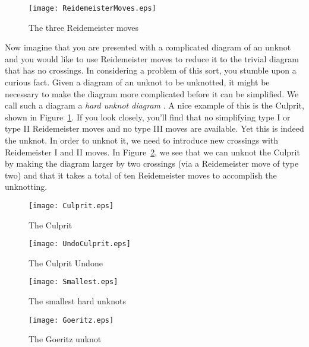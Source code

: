 \documentclass{amsart}
\begin{document}
\begin{figure}[h]
\begin{center}
\texttt{[image: ReidemeisterMoves.eps]}
\end{center}
\vspace{-.3in}
\caption{The three Reidemeister moves}
\end{figure}

Now imagine that you are presented with a complicated diagram of an unknot and you would like to use Reidemeister moves to reduce it to the trivial diagram that has no crossings. In considering a problem of this sort, you stumble upon a curious fact. Given a diagram of an unknot to be unknotted, it might be necessary to make the diagram more complicated before it can be simplified. We call such a diagram
a {\em hard unknot diagram} \cite{KL}.
A nice example of this is the Culprit, shown in Figure~\ref{culprit_intro}. If you look closely, you'll find that no simplifying type I or type II Reidemeister moves and no type III moves are available. Yet this is indeed the unknot. In order to unknot it, we need to introduce new crossings with Reidemeister I and II moves. In Figure~\ref{unknotCulprit}, we see that we can unknot the Culprit by making the diagram larger by two crossings (via a Reidemeister move of type two) and that it takes a total of ten Reidemeister moves to accomplish the unknotting.
\bigbreak


\begin{figure}[h]
\begin{center}
\texttt{[image: Culprit.eps]}
\end{center}\label{culprit_intro}
\caption{The Culprit}
\end{figure}

\begin{figure}[h]
\begin{center}
\texttt{[image: UndoCulprit.eps]}
\end{center}
\caption{The Culprit Undone}\label{unknotCulprit}
\end{figure}



\begin{figure}[h]
\begin{center}
\texttt{[image: Smallest.eps]}
\end{center}
\caption{The smallest hard unknots}
\end{figure}

\begin{figure}[h]
\begin{center}
\texttt{[image: Goeritz.eps]}
\end{center}
\caption{The Goeritz unknot}
\end{figure}
\end{document}
